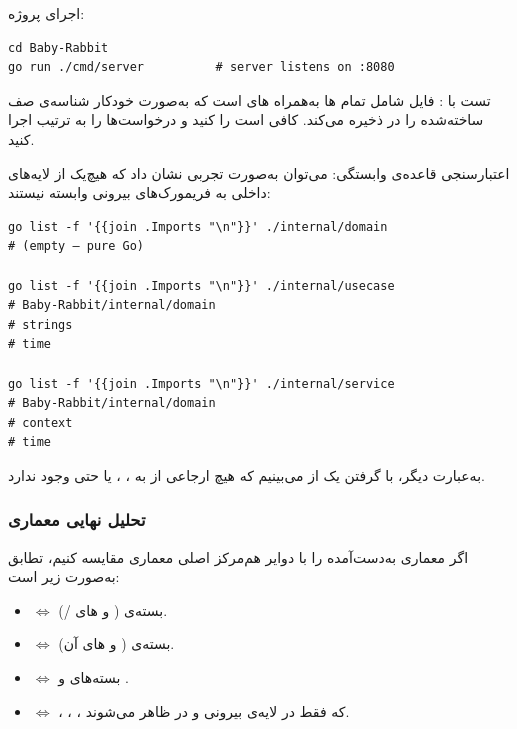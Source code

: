 
{اجرای پروژه:}
\begin{latin}
\begin{verbatim}
cd Baby-Rabbit
go run ./cmd/server          # server listens on :8080
\end{verbatim}
\end{latin}


{تست با :} فایل  شامل تمام ها به‌همراه های  است که به‌صورت خودکار شناسه‌ی صف ساخته‌شده را در  ذخیره می‌کند. کافی است  را  کنید و درخواست‌ها را به ترتیب اجرا کنید.

{اعتبارسنجی قاعده‌ی وابستگی:} می‌توان به‌صورت تجربی نشان داد که هیچ‌یک از لایه‌های داخلی به فریمورک‌های بیرونی وابسته نیستند:

\begin{latin}
\begin{verbatim}
go list -f '{{join .Imports "\n"}}' ./internal/domain
# (empty — pure Go)

go list -f '{{join .Imports "\n"}}' ./internal/usecase
# Baby-Rabbit/internal/domain
# strings
# time

go list -f '{{join .Imports "\n"}}' ./internal/service
# Baby-Rabbit/internal/domain
# context
# time
\end{verbatim}
\end{latin}

به‌عبارت دیگر، با گرفتن یک  از  می‌بینیم که هیچ ارجاعی از  به ، ،  یا حتی  وجود ندارد.

\subsubsection*{ تحلیل نهایی معماری}

اگر معماری به‌دست‌آمده را با دوایر هم‌مرکز اصلی معماری  مقایسه کنیم، تطابق به‌صورت زیر است:

\begin{itemize}
    \item {} $\Leftrightarrow$ بسته‌ی  ( و های /).
    \item {} $\Leftrightarrow$ بسته‌ی  ( و های آن).
    \item {} $\Leftrightarrow$ بسته‌های  و .
    \item {} $\Leftrightarrow$ ، ، ،  که فقط در لایه‌ی بیرونی و در  ظاهر می‌شوند.
\end{itemize}

